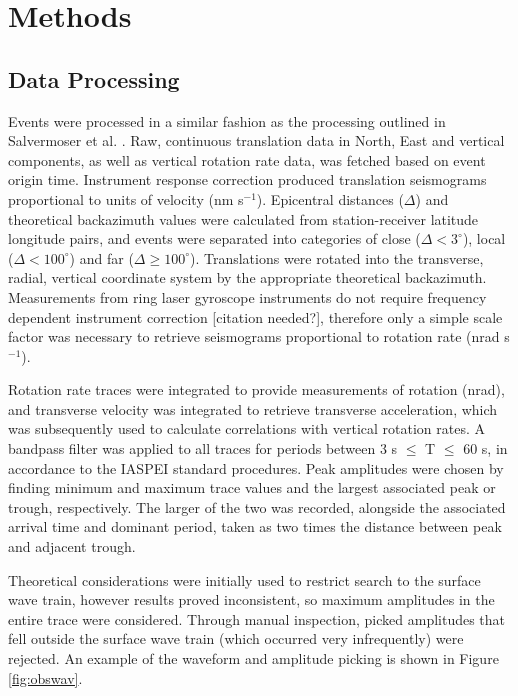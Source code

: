 \documentclass{gji}
\begin{document}
\section{Methods}
\subsection{Data Processing}\label{sec:dataproc}
Events were processed in a similar fashion as the processing outlined in Salvermoser et al. . 
Raw, continuous translation data in North, East and vertical components, as well as vertical rotation rate data, was fetched based on event origin time. Instrument response correction produced translation seismograms proportional to units of velocity (nm s$^{-1}$). Epicentral distances ($\Delta$) and theoretical backazimuth values were calculated from station-receiver latitude longitude pairs, and events were separated into categories of close ($\Delta < 3^\circ$), local ($\Delta <100^\circ$) and far ($\Delta \ge 100^\circ$). Translations were rotated into the transverse, radial, vertical coordinate system by the appropriate theoretical backazimuth. Measurements from ring laser gyroscope instruments do not require frequency dependent instrument correction [citation needed?],
therefore only a simple scale factor was necessary to retrieve seismograms proportional to rotation rate (nrad s$^{-1}$). 

Rotation rate traces were integrated to provide measurements of rotation (nrad), and transverse velocity was integrated to retrieve transverse acceleration, which was subsequently used to calculate correlations with vertical rotation rates.
A bandpass filter was applied to all traces for periods between 3 s $\le$ T $\le$ 60 s, in accordance to the IASPEI standard procedures. Peak amplitudes were chosen by finding minimum and maximum trace values and the largest associated peak or trough, respectively. The larger of the two was recorded, alongside the associated arrival time and dominant period, taken as two times the distance between peak and adjacent trough. 

Theoretical considerations were initially used to restrict search to the surface wave train, however results proved inconsistent, so maximum amplitudes in the entire trace were considered. Through manual inspection, picked amplitudes that fell outside the surface wave train (which occurred very infrequently) were rejected. An example of the waveform and amplitude picking is shown in Figure \ref{fig:obswav}.
\end{document}
